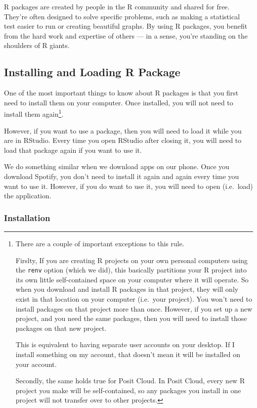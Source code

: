 \documentclass[
]{book}
\begin{document}
R packages are created by people in the R community and shared for free. They're often designed to solve specific problems, such as making a statistical test easier to run or creating beautiful graphs. By using R packages, you benefit from the hard work and expertise of others --- in a sense, you're standing on the shoulders of R giants.

\subsection{Installing and Loading R Package}\label{installing-and-loading-r-package}

One of the most important things to know about R packages is that you first need to install them on your computer. Once installed, you will not need to install them again\footnote{There are a couple of important exceptions to this rule.

  Firslty, If you are creating R projects on your own personal computers using the \texttt{renv} option (which we did), this basically partitions your R project into its own little self-contained space on your computer where it will operate. So when you download and install R packages in that project, they will only exist in that location on your computer (i.e.~your project). You won't need to install packages on that project more than once. However, if you set up a new project, and you need the same packages, then you will need to install those packages on that new project.

  This is equivalent to having separate user accounts on your desktop. If I install something on my account, that doesn't mean it will be installed on your account.

  Secondly, the same holds true for Posit Cloud. In Posit Cloud, every new R project you make will be self-contained, so any packages you install in one project will not transfer over to other projects.}.

However, if you want to use a package, then you will need to load it while you are in RStudio. Every time you open RStudio after closing it, you will need to load that package again if you want to use it.

We do something similar when we download apps on our phone. Once you download Spotify, you don't need to install it again and again every time you want to use it. However, if you do want to use it, you will need to open (i.e.~load) the application.

\subsubsection{Installation}\label{installation}
\end{document}
